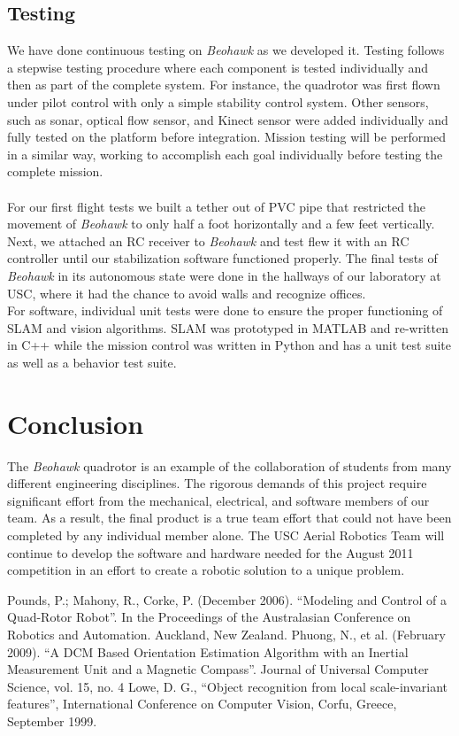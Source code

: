 \documentclass[12pt, letterpaper]{article}
\begin{document}
\subsection{Testing}
We have done continuous testing on \textit{Beohawk} as we developed it. Testing follows a stepwise testing procedure where each component is tested individually and then as part of the complete system. For instance, the quadrotor was first flown under pilot control with only a simple stability control system. Other sensors, such as sonar, optical flow sensor, and Kinect sensor were added individually and fully tested on the platform before integration. Mission testing will be performed in a similar way, working to accomplish each goal individually before testing the complete mission.
\\\\
For our first flight tests we built a tether out of PVC pipe that restricted the movement of \textit{Beohawk} to only half a foot horizontally and a few feet vertically.  Next, we attached an RC receiver to \textit{Beohawk} and test flew it with an RC controller until our stabilization software functioned properly.  The final tests of \textit{Beohawk} in its autonomous state were done in the hallways of our laboratory at USC, where it had the chance to avoid walls and recognize offices.
\vspace{1.0em}\\
For software, individual unit tests were done to ensure the proper functioning of SLAM and vision algorithms.  SLAM was prototyped in MATLAB and re-written in C++ while the mission control was written in Python and has a unit test suite as well as a behavior test suite. 

\section{Conclusion}
The \textit{Beohawk} quadrotor is an example of the collaboration of students from many different engineering disciplines. The rigorous demands of this project require significant effort from the mechanical, electrical, and software members of our team. As a result, the final product is a true team effort that could not have been completed by any individual member alone. The USC Aerial Robotics Team will continue to develop the software and hardware needed for the August 2011 competition in an effort to create a robotic solution to a unique problem.



\begin{thebibliography}{10}
Pounds, P.; Mahony, R., Corke, P. (December 2006). ``Modeling and Control of a Quad-Rotor Robot''. In the Proceedings of the Australasian Conference on Robotics and Automation. Auckland, New Zealand.
Phuong, N., et al. (February 2009). ``A DCM Based Orientation Estimation Algorithm with an Inertial Measurement Unit and a Magnetic Compass''. 
Journal of Universal Computer Science, vol. 15, no. 4
Lowe, D. G., ``Object recognition from local scale-invariant features'', International Conference on Computer Vision, Corfu, Greece, September 1999.
\end{thebibliography}
\end{document}
